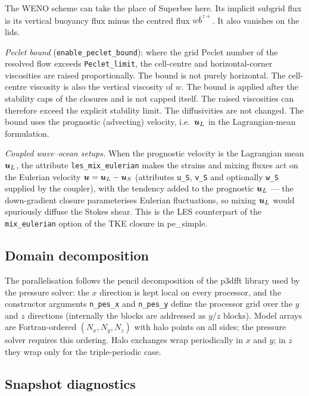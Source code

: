 \documentclass[12pt]{article}
\renewcommand{\v}[1]{{\mbox{\boldmath$ #1 $}}}  %
\newcommand{\Bar}[1]{ \overline{ #1} }
\begin{document}
The WENO scheme can take the place of Superbee here.
Its implicit subgrid flux is its vertical buoyancy flux minus the centred flux $w \Bar b^{z+}$.
It also vanishes on the lids.

\emph{Peclet bound} (\verb|enable_peclet_bound|): where the grid Peclet
number of the resolved flow exceeds \verb|Peclet_limit|, the cell-centre
and horizontal-corner viscosities are raised proportionally. The bound is
not purely horizontal. The cell-centre viscosity is also the vertical
viscosity of $w$. The bound is applied after the stability caps of the
closures and is not capped itself. The raised viscosities can therefore
exceed the explicit stability limit. The diffusivities are not changed.
The bound uses the prognostic
(advecting) velocity, i.e.\ $\v u_L$ in the Lagrangian-mean formulation.

\emph{Coupled wave--ocean setups.} When the prognostic velocity is the
Lagrangian mean $\v u_L$, the attribute \verb|les_mix_eulerian| makes the
strains and mixing fluxes act on the Eulerian velocity
$\v u = \v u_L - \v u_S$ (attributes \verb|u_S|, \verb|v_S| and optionally
\verb|w_S| supplied by the coupler), with the tendency added to the
prognostic $\v u_L$ --- the down-gradient closure parameterises Eulerian
fluctuations, so mixing $\v u_L$ would spuriously diffuse the Stokes
shear. This is the LES counterpart of the \verb|mix_eulerian| option of
the TKE closure in pe\_simple.

\subsection*{Domain decomposition}

The parallelisation follows the pencil decomposition of the p3dfft
library used by the pressure solver: the $x$ direction is kept local on
every processor, and the constructor arguments \verb|n_pes_x| and
\verb|n_pes_y| define the processor grid over the $y$ and $z$ directions
(internally the blocks are addressed as $y$/$z$ blocks). Model arrays are
Fortran-ordered $(N_x, N_y, N_z)$ with halo points on all sides; the
pressure solver requires this ordering. Halo exchanges wrap periodically
in $x$ and $y$; in $z$ they wrap only for the triple-periodic case.

\subsection*{Snapshot diagnostics}
\end{document}
